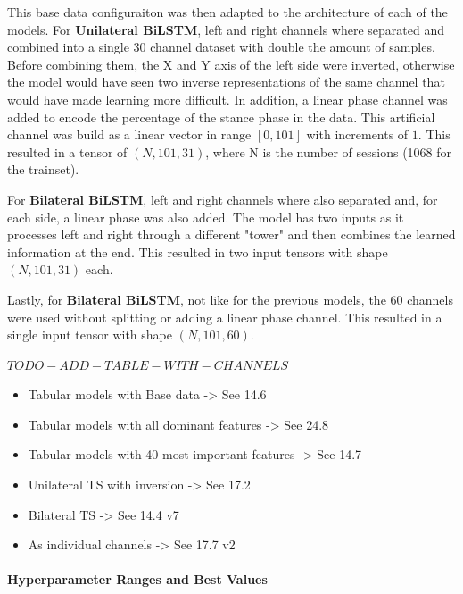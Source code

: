 This base data configuraiton was then adapted to the architecture of each of the models. For \textbf{Unilateral BiLSTM}, left and right channels where separated and combined into a single 30 channel dataset with double the amount of samples. Before combining them, the X and Y axis of the left side were inverted, otherwise the model would have seen two inverse representations of the same channel that would have made learning more difficult. In addition, a linear phase channel was added to encode the percentage of the stance phase in the data. This artificial channel was build as a linear vector in range $[0, 101]$ with increments of $1$. This resulted in a tensor of $(N, 101, 31)$, where N is the number of sessions (1068 for the trainset).

For \textbf{Bilateral BiLSTM}, left and right channels where also separated and, for each side, a linear phase was also added. The model has two inputs as it processes left and right through a different "tower" and then combines the learned information at the end. This resulted in two input tensors with shape $(N, 101, 31)$ each.

Lastly, for \textbf{Bilateral BiLSTM}, not like for the previous models, the 60 channels were used without splitting or adding a linear phase channel. This resulted in a single input tensor with shape $(N, 101, 60)$.

$TODO-ADD-TABLE-WITH-CHANNELS$

\begin{itemize}
    \item Tabular models with Base data -> See 14.6
    \item Tabular models with all dominant features ->  See 24.8
    \item Tabular models with 40 most important features -> See 14.7
    \item Unilateral TS with inversion -> See 17.2
    \item Bilateral TS -> See 14.4 v7
    \item As individual channels -> See 17.7 v2
\end{itemize}

\paragraph{Hyperparameter Ranges and Best Values}

